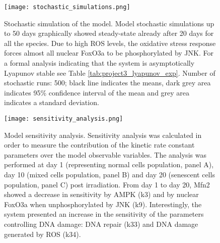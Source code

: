 \begin{figure}[tb]
	\begin{center}
		\texttt{[image: stochastic\_simulations.png]}
		\caption[Stochastic simulation of the model]{Stochastic simulation of the model. Model stochastic simulations up to 50 days graphically showed steady-state already after 20 days for all the species. Due to high ROS levels, the oxidative stress response forces almost all nuclear FoxO3a to be phosphorylated by JNK. For a formal analysis indicating that the system is asymptotically Lyapunov stable see Table \ref{tab:project3_lyapunov_exp}. Number of stochastic runs: 500; black line indicates the means, dark grey area indicates 95\% confidence interval of the mean and grey area indicates a standard deviation.}
		\label{fig:project3_stochastic_simulations}
	\end{center}
\end{figure}
\clearpage

\begin{figure}[tb]
	\begin{center}
		\texttt{[image: sensitivity\_analysis.png]}
		\caption[Model sensitivity analysis]{Model sensitivity analysis. Sensitivity analysis was calculated in order to measure the contribution of the kinetic rate constant parameters over the model observable variables. The analysis was performed at day 1 (representing normal cells population, panel A), day 10 (mixed cells population, panel B) and day 20 (senescent cells population, panel C) post irradiation. From day 1 to day 20, Mfn2 showed a decrease in sensitivity by AMPK (k3) and by nuclear FoxO3a when unphosphorylated by JNK (k9). Interestingly, the system presented an increase in the sensitivity of the parameters controlling DNA damage: DNA repair (k33) and DNA damage generated by ROS (k34).}
		\label{fig:project3_sensitivity_analysis}
	\end{center}
\end{figure}
\clearpage





